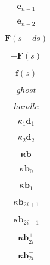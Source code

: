 \documentclass[a4paper,11pt,fleqn]{book}
\newcommand{\vect}[1]{\boldsymbol{#1}}
\begin{document}
\begin{equation}
\vect{e}_{n-1}
\end{equation}


\begin{equation}
\vect{e}_{n-2}
\end{equation}


\begin{equation}
\vect{F}(s+ds)
\end{equation}


\begin{equation}
-\vect{F}(s)
\end{equation}


\begin{equation}
\vect{f}(s)
\end{equation}


\begin{equation}
ghost
\end{equation}


\begin{equation}
handle
\end{equation}


\begin{equation}
\kappa_1 \vect{d}_{1}
\end{equation}


\begin{equation}
\kappa_2 \vect{d}_{2}
\end{equation}


\begin{equation}
\vect{\kappa b}
\end{equation}


\begin{equation}
\vect{\kappa b}_0
\end{equation}


\begin{equation}
\vect{\kappa b}_1
\end{equation}


\begin{equation}
\vect{\kappa b}_{2i+1}
\end{equation}


\begin{equation}
\vect{\kappa b}_{2i-1}
\end{equation}


\begin{equation}
\vect{\kappa b}_{2i}^+
\end{equation}


\begin{equation}
\vect{\kappa b}_{2i}^-
\end{equation}
\end{document}
